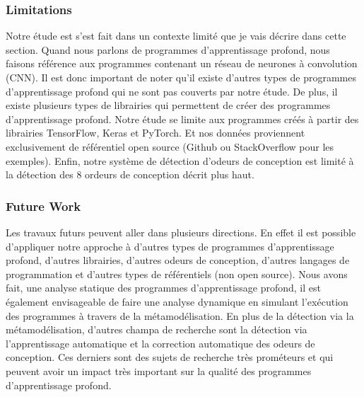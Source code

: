 \label{sec:limitationsFutureWork}

\subsubsection{Limitations}
\label{sec:limitations}
Notre étude est s'est fait dans un contexte limité que je vais décrire dans
cette section. Quand nous parlons de programmes d'apprentissage profond, nous faisons référence
aux programmes contenant un réseau de neurones à convolution (CNN). Il est
donc important de noter qu'il existe d'autres types de programmes
d'apprentissage profond qui ne sont pas couverts par notre étude. De plus, il
existe plusieurs types de librairies qui permettent de créer des programmes
d'apprentissage profond. Notre étude se limite aux programmes créés à
partir des librairies TensorFlow, Keras et PyTorch. Et nos données proviennent
exclusivement de référentiel open source (Github ou StackOverflow pour les
exemples). Enfin, notre système de détection d'odeurs de conception est limité à
la détection des 8 ordeurs de conception décrit plus haut.\\

\subsubsection{Future Work}
\label{sec:futureWork}
Les travaux futurs peuvent aller dans plusieurs directions. En effet il est
possible d'appliquer notre approche à d'autres types de programmes
d'apprentissage profond, d'autres librairies, d'autres odeurs de conception,
d'autres langages de programmation et d'autres types de référentiels (non open source).
Nous avons fait, une analyse statique des programmes d'apprentissage profond, il
est également envisageable de faire une analyse dynamique en simulant
l'exécution des programmes à travers de la métamodélisation. En plus de la
détection via la métamodélisation, d'autres champa de recherche sont la
détection via l'apprentissage automatique et la correction automatique des
odeurs de conception. Ces derniers sont des sujets de recherche très prométeurs
et qui peuvent avoir un impact très important sur la qualité des programmes d'apprentissage profond.







